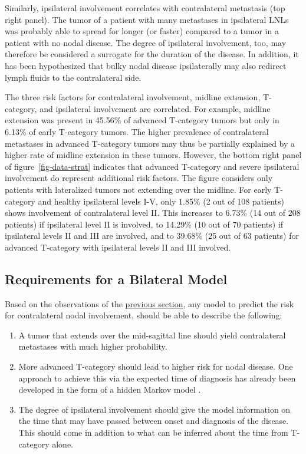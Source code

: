 \documentclass[
  sn-mathphys-num,
]{sn-jnl}
\providecommand{\tightlist}{%
  \setlength{\itemsep}{0pt}\setlength{\parskip}{0pt}}\usepackage{longtable,booktabs,array}
\begin{document}
Similarly, ipsilateral involvement correlates with contralateral
metastasis (top right panel). The tumor of a patient with many
metastases in ipsilateral LNLs was probably able to spread for longer
(or faster) compared to a tumor in a patient with no nodal disease. The
degree of ipsilateral involvement, too, may therefore be considered a
surrogate for the duration of the disease. In addition, it has been
hypothesized that bulky nodal disease ipsilaterally may also redirect
lymph fluids to the contralateral side.

The three risk factors for contralateral involvement, midline extension,
T-category, and ipsilateral involvement are correlated. For example,
midline extension was present in 45.56\% of advanced T-category tumors
but only in 6.13\% of early T-category tumors. The higher prevalence of
contralateral metastases in advanced T-category tumors may thus be
partially explained by a higher rate of midline extension in these
tumors. However, the bottom right panel of figure~\ref{fig-data-strat}
indicates that advanced T-category and severe ipsilateral involvement do
represent additional risk factors. The figure considers only patients
with lateralized tumors not extending over the midline. For early
T-category and healthy ipsilateral levels I-V, only 1.85\% (2 out of 108
patients) shows involvement of contralateral level II. This increases to
6.73\% (14 out of 208 patients) if ipsilateral level II is involved, to
14.29\% (10 out of 70 patients) if ipsilateral levels II and III are
involved, and to 39.68\% (25 out of 63 patients) for advanced T-category
with ipsilateral levels II and III involved.

\subsection{Requirements for a Bilateral Model}\label{sec-requirements}

Based on the observations of the \hyperref[sec-data-strat]{previous
section}, any model to predict the risk for contralateral nodal
involvement, should be able to describe the following:

\begin{enumerate}
\def\labelenumi{\arabic{enumi}.}
\tightlist
\item
  A tumor that extends over the mid-sagittal line should yield
  contralateral metastases with much higher probability.
\item
  More advanced T-category should lead to higher risk for nodal disease.
  One approach to achieve this via the expected time of diagnosis has
  already been developed in the form of a hidden Markov model
  \citep{ludwig_hidden_2021}.
\item
  The degree of ipsilateral involvement should give the model
  information on the time that may have passed between onset and
  diagnosis of the disease. This should come in addition to what can be
  inferred about the time from T-category alone.
\end{enumerate}
\end{document}
